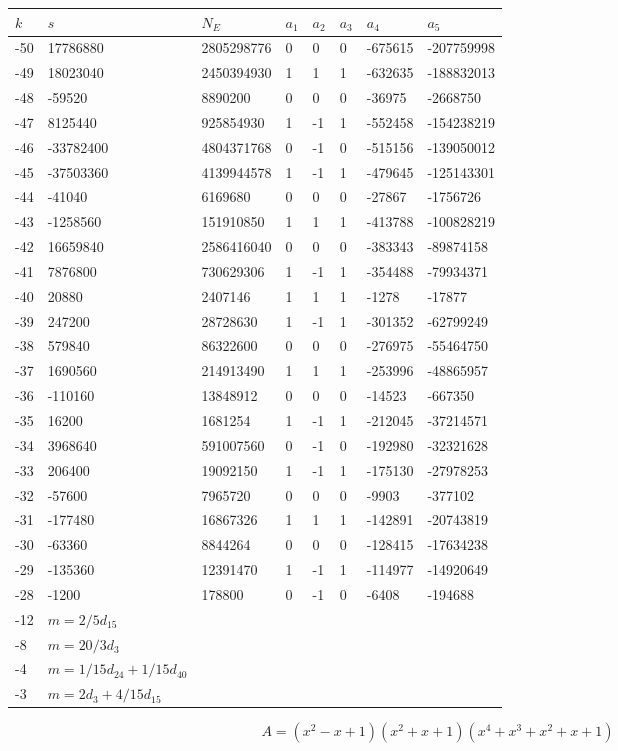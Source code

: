 \documentclass{amsart}
\begin{document}
\begin{longtable}{|l|l|l|lllll|}
\hline
$k$ & $s$ & $N_E$ & $a_1$ & $a_2$ & $a_3$ & $a_4$ & $a_5$\\
\hline
-50&17786880&2805298776&0&0&0&-675615&-207759998\\
-49&18023040&2450394930&1&1&1&-632635&-188832013\\
-48&-59520&8890200&0&0&0&-36975&-2668750\\
-47&8125440&925854930&1&-1&1&-552458&-154238219\\
-46&-33782400&4804371768&0&-1&0&-515156&-139050012\\
-45&-37503360&4139944578&1&-1&1&-479645&-125143301\\
-44&-41040&6169680&0&0&0&-27867&-1756726\\
-43&-1258560&151910850&1&1&1&-413788&-100828219\\
-42&16659840&2586416040&0&0&0&-383343&-89874158\\
-41&7876800&730629306&1&-1&1&-354488&-79934371\\
-40&20880&2407146&1&1&1&-1278&-17877\\
-39&247200&28728630&1&-1&1&-301352&-62799249\\
-38&579840&86322600&0&0&0&-276975&-55464750\\
-37&1690560&214913490&1&1&1&-253996&-48865957\\
-36&-110160&13848912&0&0&0&-14523&-667350\\
-35&16200&1681254&1&-1&1&-212045&-37214571\\
-34&3968640&591007560&0&-1&0&-192980&-32321628\\
-33&206400&19092150&1&-1&1&-175130&-27978253\\
-32&-57600&7965720&0&0&0&-9903&-377102\\
-31&-177480&16867326&1&1&1&-142891&-20743819\\
-30&-63360&8844264&0&0&0&-128415&-17634238\\
-29&-135360&12391470&1&-1&1&-114977&-14920649\\
-28&-1200&178800&0&-1&0&-6408&-194688\\
-12&$m=2/5d_{15}$&&\multicolumn{5}{c|}{}\\
-8&$m=20/3d_{3}$&&\multicolumn{5}{c|}{}\\
-4&$m=1/15d_{24}+1/15d_{40}$&&\multicolumn{5}{c|}{}\\
-3&$m=2d_{3}+4/15d_{15}$&&\multicolumn{5}{c|}{}\\
\hline
\end{longtable}
$$A=(x^2
 - x
 + 1)(x^2
 + x
 + 1)(x^4
 + x^3
 + x^2
 + x
 + 1)$$
\end{document}
